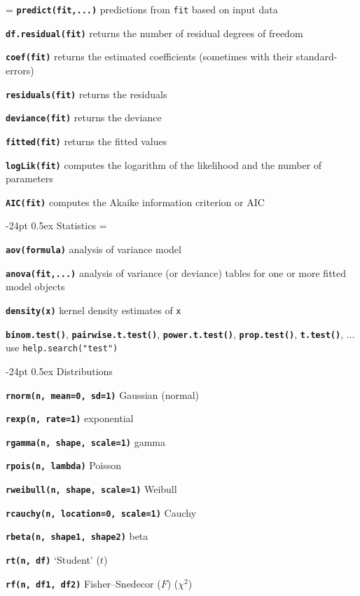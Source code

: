 \documentclass[10pt,landscape]{article}
\makeatletter
\renewcommand\section{\@startsection{section}{1}{0mm}%
                                     {-24pt}%
                                     {0.5ex}%
                                {\color{blue}\normalfont\large\bfseries}}
\newcommand{\code}{\texttt}
\newcommand{\bcode}[1]{\texttt{\textbf{#1}}}
\makeatother
\begin{document}
\begin{multicols*}{3}
\everypar={\hangindent=9mm}
\bcode{predict(fit,...)}  predictions from \code{fit} based on input data

\bcode{df.residual(fit)}  returns the number of residual degrees of freedom

\bcode{coef(fit)}  returns the estimated coefficients (sometimes with their standard-errors)

\bcode{residuals(fit)}  returns the residuals

\bcode{deviance(fit)}  returns the deviance

\bcode{fitted(fit)}  returns the fitted values

\bcode{logLik(fit)}  computes the logarithm of the likelihood and the number of parameters

\bcode{AIC(fit)}  computes the Akaike information criterion or AIC

\section{Statistics}
\everypar={\hangindent=9mm}

\bcode{aov(formula)} analysis of variance model

\bcode{anova(fit,...)} analysis of variance (or deviance) tables for one or more
     fitted model objects

\bcode{density(x)} kernel density estimates of \code{x}

\bcode{binom.test()}, \bcode{pairwise.t.test()}, \bcode{power.t.test()},
\bcode{prop.test()}, \bcode{t.test()}, ... use
\code{help.search("test")}

\section{Distributions}

\bcode{rnorm(n, mean=0, sd=1)} Gaussian (normal)

\bcode{rexp(n, rate=1)} exponential

\bcode{rgamma(n, shape, scale=1)} gamma

\bcode{rpois(n, lambda)} Poisson

\bcode{rweibull(n, shape, scale=1)} Weibull

\bcode{rcauchy(n, location=0, scale=1)} Cauchy

\bcode{rbeta(n, shape1, shape2)} beta

\bcode{rt(n, df)} `Student' ($t$)

\bcode{rf(n, df1, df2)} Fisher--Snedecor ($F$)  ($\chi^2$)


\end{multicols*}
\end{document}
